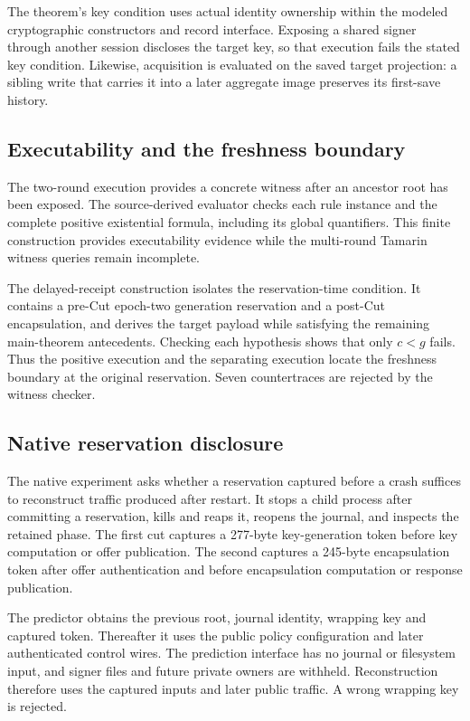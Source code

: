 The theorem's key condition uses actual identity ownership within the modeled
cryptographic constructors and record interface. Exposing a shared signer
through another session discloses the target key, so that execution fails
the stated key condition. Likewise, acquisition is evaluated on the saved
target projection: a sibling write that carries it into
a later aggregate image preserves its first-save history.

\subsection{Executability and the freshness boundary}

The two-round execution provides a concrete witness after an
ancestor root has been exposed. The source-derived evaluator checks each
rule instance and the complete positive existential formula, including its
global quantifiers. This finite construction provides executability
evidence while the multi-round Tamarin witness queries
remain incomplete.

The delayed-receipt construction isolates the reservation-time condition.
It contains a pre-Cut epoch-two generation reservation and a post-Cut
encapsulation, and derives the target payload while satisfying the remaining
main-theorem antecedents. Checking each hypothesis shows that only $c<g$
fails. Thus the positive execution and the separating execution locate
the freshness boundary at the original reservation. Seven countertraces are
rejected by the witness checker.

\subsection{Native reservation disclosure}

The native experiment asks whether a reservation captured before a crash
suffices to reconstruct traffic produced after restart. It stops a child
process after committing a reservation, kills and reaps it, reopens the
journal, and inspects the retained phase. The first cut captures a 277-byte
key-generation token before key computation or offer publication. The
second captures a 245-byte encapsulation token after offer authentication
and before encapsulation computation or response publication.

The predictor obtains the previous root, journal identity, wrapping key and
captured token. Thereafter it uses the public policy configuration and later
authenticated control wires. The prediction interface has no journal or
filesystem input, and signer files and future private owners are withheld.
Reconstruction therefore uses the captured inputs and later public traffic.
A wrong wrapping key is rejected.


